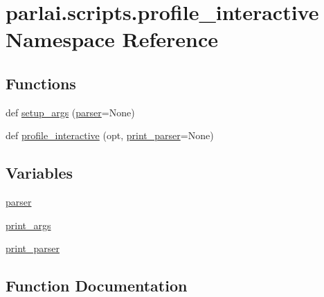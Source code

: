 \hypertarget{namespaceparlai_1_1scripts_1_1profile__interactive}{}\section{parlai.\+scripts.\+profile\+\_\+interactive Namespace Reference}
\label{namespaceparlai_1_1scripts_1_1profile__interactive}
\subsection*{Functions}
\begin{DoxyCompactItemize}
\item 
def \hyperlink{namespaceparlai_1_1scripts_1_1profile__interactive_ae1f4afb65e0f6c7679baa3af43c3eda0}{setup\+\_\+args} (\hyperlink{namespaceparlai_1_1scripts_1_1profile__interactive_a716b72ad1a9b1269468e9e2acc7ad6e5}{parser}=None)
\item 
def \hyperlink{namespaceparlai_1_1scripts_1_1profile__interactive_a5657fbf0eae34d1a0e5b48df3a7ded54}{profile\+\_\+interactive} (opt, \hyperlink{namespaceparlai_1_1scripts_1_1profile__interactive_a0653e122493d1680d4f0376069714916}{print\+\_\+parser}=None)
\end{DoxyCompactItemize}
\subsection*{Variables}
\begin{DoxyCompactItemize}
\item 
\hyperlink{namespaceparlai_1_1scripts_1_1profile__interactive_a716b72ad1a9b1269468e9e2acc7ad6e5}{parser}
\item 
\hyperlink{namespaceparlai_1_1scripts_1_1profile__interactive_a6d8d2d18ac538424c535e179e83c0f8d}{print\+\_\+args}
\item 
\hyperlink{namespaceparlai_1_1scripts_1_1profile__interactive_a0653e122493d1680d4f0376069714916}{print\+\_\+parser}
\end{DoxyCompactItemize}


\subsection{Function Documentation}
\mbox{\label{namespaceparlai_1_1scripts_1_1profile__interactive_a5657fbf0eae34d1a0e5b48df3a7ded54}} 

